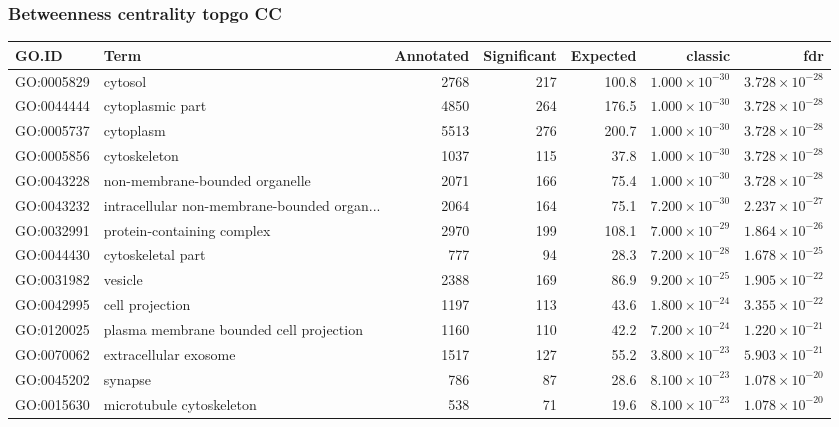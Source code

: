 \subsubsection{Betweenness centrality topgo CC}
\begin{table}[ht]
\centering
\begin{tabular}{llrrrrr}
  \hline
GO.ID & Term & Annotated & Significant & Expected & classic & fdr \\ 
  \hline
GO:0005829 & cytosol & 2768 & 217 & 100.8 & $1.000 \times 10^{-30}$ & $3.728 \times 10^{-28}$ \\ 
  GO:0044444 & cytoplasmic part & 4850 & 264 & 176.5 & $1.000 \times 10^{-30}$ & $3.728 \times 10^{-28}$ \\ 
  GO:0005737 & cytoplasm & 5513 & 276 & 200.7 & $1.000 \times 10^{-30}$ & $3.728 \times 10^{-28}$ \\ 
  GO:0005856 & cytoskeleton & 1037 & 115 & 37.8 & $1.000 \times 10^{-30}$ & $3.728 \times 10^{-28}$ \\ 
  GO:0043228 & non-membrane-bounded organelle & 2071 & 166 & 75.4 & $1.000 \times 10^{-30}$ & $3.728 \times 10^{-28}$ \\ 
  GO:0043232 & intracellular non-membrane-bounded organ... & 2064 & 164 & 75.1 & $7.200 \times 10^{-30}$ & $2.237 \times 10^{-27}$ \\ 
  GO:0032991 & protein-containing complex & 2970 & 199 & 108.1 & $7.000 \times 10^{-29}$ & $1.864 \times 10^{-26}$ \\ 
  GO:0044430 & cytoskeletal part & 777 & 94 & 28.3 & $7.200 \times 10^{-28}$ & $1.678 \times 10^{-25}$ \\ 
  GO:0031982 & vesicle & 2388 & 169 & 86.9 & $9.200 \times 10^{-25}$ & $1.905 \times 10^{-22}$ \\ 
  GO:0042995 & cell projection & 1197 & 113 & 43.6 & $1.800 \times 10^{-24}$ & $3.355 \times 10^{-22}$ \\ 
  GO:0120025 & plasma membrane bounded cell projection & 1160 & 110 & 42.2 & $7.200 \times 10^{-24}$ & $1.220 \times 10^{-21}$ \\ 
  GO:0070062 & extracellular exosome & 1517 & 127 & 55.2 & $3.800 \times 10^{-23}$ & $5.903 \times 10^{-21}$ \\ 
  GO:0045202 & synapse & 786 & 87 & 28.6 & $8.100 \times 10^{-23}$ & $1.078 \times 10^{-20}$ \\ 
  GO:0015630 & microtubule cytoskeleton & 538 & 71 & 19.6 & $8.100 \times 10^{-23}$ & $1.078 \times 10^{-20}$ \\ 

\end{tabular}
\end{table}

